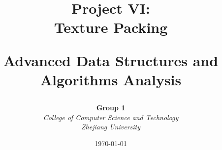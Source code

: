 \documentclass[a4paper,12pt]{article}
\renewcommand{\headrulewidth}{0.4pt}
\renewcommand{\footrulewidth}{0.4pt}
\begin{document}

\setlength{\headheight}{15pt} 
\pagestyle{fancy}
\fancyhf{} 
\fancyfoot[C]{\thepage}
\renewcommand{\headrulewidth}{0.4pt}
\renewcommand{\footrulewidth}{0.4pt}


\title{
    \centering
    \vspace{1cm}
    \vspace{2cm}
    {\Huge\bfseries Project VI:\\[0.5em]Texture Packing\par}
    \vspace{0.5cm}
    {Advanced Data Structures and Algorithms Analysis}\par
    \vspace{1cm}
}
\author{
    \textbf{Group 1} \\[0.5cm]
    \textit{College of Computer Science and Technology} \\
    \textit{Zhejiang University}
}
\date{\today}

\end{document}
